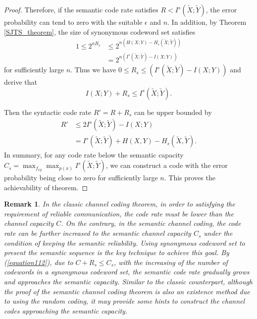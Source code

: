 \documentclass[12pt, draftclsnofoot,onecolumn]{IEEEtran}
\newtheorem{remark}{\bf{Remark}}
\begin{document}
\begin{proof}
Therefore, if the semantic code rate satisfies $R<I^s(\tilde{X};\tilde{Y})$, the error probability can tend to zero with the suitable $\epsilon$ and $n$.
In addition, by Theorem \ref{SJTS_theorem}, the size of synonymous codeword set satisfies
\begin{equation}
\begin{aligned}
1\leq 2^{nR_s}& \leq  2^{n\left(H(X;Y)-H_s(\tilde{X};\tilde{Y})\right)}\\
                        &= 2^{n\left(I^s(\tilde{X};\tilde{Y})-I(X;Y)\right)}
\end{aligned}
\end{equation}
for sufficiently large $n$. Thus we have $0 \leq R_s \leq (I^s(\tilde{X};\tilde{Y})-I(X;Y))$ and derive that
\begin{equation}\label{equation112}
I(X;Y)+R_s\leq I^s(\tilde{X};\tilde{Y}).
\end{equation}

Then the syntactic code rate $R'=R+R_s$ can be upper bounded by
\begin{equation}
\begin{aligned}
R' &\leq 2I^s(\tilde{X};\tilde{Y})-I(X;Y)\\
    &= I^s(\tilde{X};\tilde{Y})+H(X,Y)-H_s(\tilde{X},\tilde{Y}).
\end{aligned}
\end{equation}
In summary, for any code rate below the semantic capacity $C_s=\max_{f_{xy}}\max_{p(x)}I^s(\tilde{X};\tilde{Y})$, we can construct a code with the error probability being close to zero for sufficiently large $n$. This proves the achievability of theorem.
\end{proof}

\begin{remark}
In the classic channel coding theorem, in order to satisfying the requirement of reliable communication, the code rate must be lower than the channel capacity $C$. On the contrary, in the semantic channel coding, the code rate can be further increased to the semantic channel capacity $C_s$ under the condition of keeping the semantic reliability. Using synonymous codeword set to present the semantic sequence is the key technique to achieve this goal. By (\ref{equation112}), due to $C+R_s\leq C_s$, with the increasing of the number of codewords in a synonymous codeword set, the semantic code rate gradually grows and approaches the semantic capacity. Similar to the classic counterpart, although the proof of the semantic channel coding theorem is also an existence method due to using the random coding, it may provide some hints to construct the channel codes approaching the semantic capacity.
\end{remark}
\end{document}
